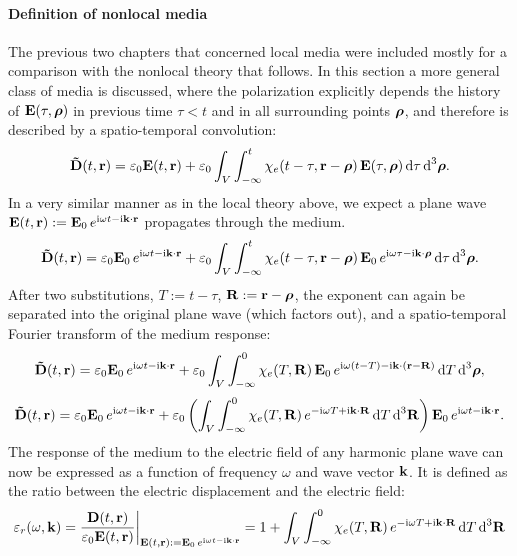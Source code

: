 \paragraph{Definition of nonlocal media}%
The previous two chapters that concerned local media were included mostly for a comparison with the nonlocal theory that follows.
In this section a more general class of media is discussed, where the polarization explicitly depends the history of $\mathbf{E}(\tau, \boldsymbol{\rho})$ in previous time $\tau < t$ and in all surrounding points $\boldsymbol{\rho}$, and therefore is described by a spatio-temporal convolution:
\begin{equation} \mathbf{\tilde{D}}(t,{\mathbf{r}}) = \varepsilon_0 \mathbf{E}(t,{\mathbf{r}}) + \varepsilon_0\int_{V} \int_{-\infty}^{t} \chi_e(t-\tau, {\mathbf{r}}-\boldsymbol{\rho}) \, \mathbf{E}(\tau,\boldsymbol{\rho}) \,\mbox{d}\tau \,\mbox{d}^3\boldsymbol{\rho}. \label{eq_chi_convol_nonloc}\end{equation}
In a very similar manner as in the local theory above, we expect a plane wave $\mathbf{E}(t, {\mathbf{r}}) := \mathbf{E}_0 \, e^{{\mathrm i}\omega t - {\mathrm i}{\mathbf{k}}\cdot{\mathbf{r}}}$ propagates through the medium. 
\begin{equation} \mathbf{\tilde{D}}(t,{\mathbf{r}}) = \varepsilon_0 \mathbf{E}_0 \, e^{{\mathrm i}\omega t - {\mathrm i}{\mathbf{k}}\cdot{\mathbf{r}}} + \varepsilon_0\int_{V} \int_{-\infty}^{t} \chi_e(t-\tau, {\mathbf{r}}-\boldsymbol{\rho}) \, \mathbf{E}_0 \, e^{{\mathrm i}\omega \tau - {\mathrm i}{\mathbf{k}}\cdot\boldsymbol{\rho}} \,\mbox{d}\tau \,\mbox{d}^3\boldsymbol{\rho}. \label{eq_chi_convol_harm_nonloc}\end{equation}
After two  substitutions, $T:=t-\tau$, $\mathbf{R}:={\mathbf{r}}-\boldsymbol{\rho}$, the exponent can again be separated into the original plane wave (which factors out), and a spatio-temporal Fourier transform of the medium response:
$$				 \mathbf{\tilde{D}}(t,{\mathbf{r}}) = \varepsilon_0 \mathbf{E}_0 \, e^{{\mathrm i}\omega t - {\mathrm i}{\mathbf{k}}\cdot{\mathbf{r}}} + \varepsilon_0\int_{V} \int_{-\infty}^{0} \chi_e(T, \mathbf{R}) \, \mathbf{E}_0 \, e^{{\mathrm i}\omega (t - T) - {\mathrm i}{\mathbf{k}}\cdot({\mathbf{r}} - \mathbf{R})} \,\mbox{d}T \,\mbox{d}^3\boldsymbol{\rho},$$
$$				 \mathbf{\tilde{D}}(t,{\mathbf{r}}) = \varepsilon_0 \mathbf{E}_0 \, e^{{\mathrm i}\omega t - {\mathrm i}{\mathbf{k}}\cdot{\mathbf{r}}} + \varepsilon_0\left( \int_{V} \int_{-\infty}^{0} \chi_e(T, \mathbf{R})  \, e^{-{\mathrm i}\omega T + {\mathrm i}{\mathbf{k}}\cdot \mathbf{R}}\,\mbox{d}T \,\mbox{d}^3 \mathbf{R} \right) \mathbf{E}_0 \, e^{{\mathrm i}\omega t - {\mathrm i}{\mathbf{k}}\cdot{\mathbf{r}}}.$$
The response of the medium to the electric field of any harmonic plane wave can now be expressed as a function of frequency $\omega$ and wave vector ${\mathbf{k}}$. It is defined as the ratio between the electric displacement and the electric field:
\begin{equation} \varepsilon_r(\omega, {\mathbf{k}}) = \frac{\mathbf{D}(t,{\mathbf{r}})}{\varepsilon_0 \mathbf{E}(t,{\mathbf{r}})} \biggr|_{\mathbf{E}(t, {\mathbf{r}}) := \mathbf{E}_0 \, e^{{\mathrm i}\omega t - {\mathrm i}{\mathbf{k}}\cdot{\mathbf{r}}}} = 1 + \int_{V} \int_{-\infty}^{0} \chi_e(T, \mathbf{R}) \,e^{-{\mathrm i}\omega T + {\mathrm i}{\mathbf{k}}\cdot \mathbf{R}} \,\mbox{d}T \,\mbox{d}^3\mathbf{R} \label{eq_eps_nonloc}\end{equation}
